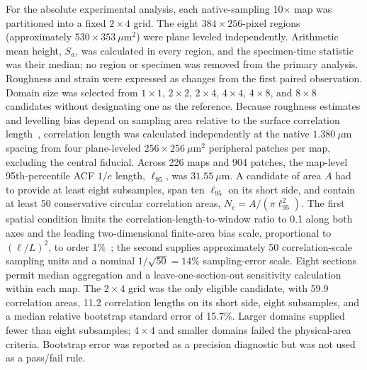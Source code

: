 \documentclass[final,12pt]{cas-sc}
\begin{document}
For the absolute experimental analysis, each native-sampling 10$\times$ map was partitioned into a fixed $2\times4$ grid. The eight $384\times256$-pixel regions (approximately $530\times353~\mu\mathrm{m}^2$) were plane leveled independently. Arithmetic mean height, $S_a$, was calculated in every region, and the specimen-time statistic was their median; no region or specimen was removed from the primary analysis. Roughness and strain were expressed as changes from the first paired observation. Domain size was selected from $1\times1$, $2\times2$, $2\times4$, $4\times4$, $4\times8$, and $8\times8$ candidates without designating one as the reference. Because roughness estimates and levelling bias depend on sampling area relative to the surface correlation length~\cite{necas2020roughness,singh2024representative}, correlation length was calculated independently at the native $1.380~\mu$m spacing from four plane-leveled $256\times256~\mu\mathrm{m}^2$ peripheral patches per map, excluding the central fiducial. Across 226 maps and 904 patches, the map-level 95th-percentile ACF $1/e$ length, $\ell_{95}$, was $31.55~\mu$m. A candidate of area $A$ had to provide at least eight subsamples, span ten $\ell_{95}$ on its short side, and contain at least 50 conservative circular correlation areas, $N_c=A/(\pi\ell_{95}^2)$. The first spatial condition limits the correlation-length-to-window ratio to 0.1 along both axes and the leading two-dimensional finite-area bias scale, proportional to $(\ell/L)^2$, to order 1\%~\cite{necas2020roughness}; the second supplies approximately 50 correlation-scale sampling units and a nominal $1/\sqrt{50}=14\%$ sampling-error scale. Eight sections permit median aggregation and a leave-one-section-out sensitivity calculation within each map. The $2\times4$ grid was the only eligible candidate, with 59.9 correlation areas, 11.2 correlation lengths on its short side, eight subsamples, and a median relative bootstrap standard error of 15.7\%. Larger domains supplied fewer than eight subsamples; $4\times4$ and smaller domains failed the physical-area criteria. Bootstrap error was reported as a precision diagnostic but was not used as a pass/fail rule.
\end{document}
